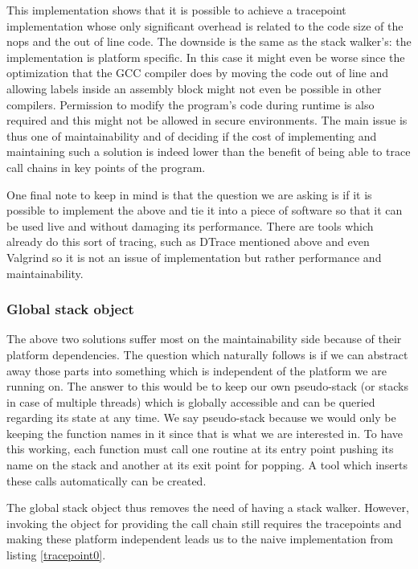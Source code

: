 This implementation shows that it is possible to achieve a tracepoint implementation whose only significant overhead is related to the code size of the nops and the out of line code. The downside is the same as the stack walker's: the implementation is platform specific. In this case it might even be worse since the optimization that the GCC compiler does by moving the code out of line and allowing labels inside an assembly block might not even be possible in other compilers. Permission to modify the program's code during runtime is also required and this might not be allowed in secure environments. The main issue is thus one of maintainability and of deciding if the cost of implementing and maintaining such a solution is indeed lower than the benefit of being able to trace call chains in key points of the program.

One final note to keep in mind is that the question we are asking is if it is possible to implement the above and tie it into a piece of software so that it can be used live and without damaging its performance. There are tools which already do this sort of tracing, such as DTrace mentioned above and even Valgrind so it is not an issue of implementation but rather performance and maintainability.

\subsubsection{Global stack object}
\label{subsubsection:globalstackobject}

The above two solutions suffer most on the maintainability side because of their platform dependencies. The question which naturally follows is if we can abstract away those parts into something which is independent of the platform we are running on. The answer to this would be to keep our own pseudo-stack (or stacks in case of multiple threads) which is globally accessible and can be queried regarding its state at any time. We say pseudo-stack because we would only be keeping the function names in it since that is what we are interested in. To have this working, each function must call one routine at its entry point pushing its name on the stack and another at its exit point for popping. A tool which inserts these calls automatically can be created.

The global stack object thus removes the need of having a stack walker. However, invoking the object for providing the call chain still requires the tracepoints and making these platform independent leads us to the naive implementation from listing \ref{tracepoint0}.

